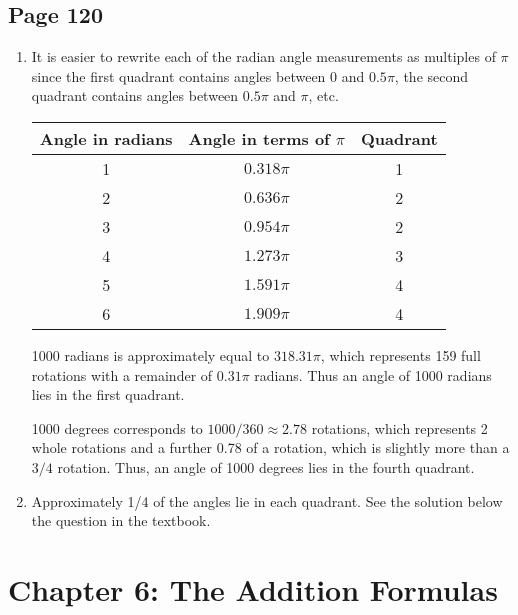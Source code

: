 \documentclass{article}
\newenvironment{solutions}[1]
{\subsection*{#1}
 \begin{enumerate}[leftmargin=1.5em]}
{\end{enumerate}}
\newcommand{\solution}{\item}
\begin{document}
\begin{solutions}{Page 120}
\solution %
It is easier to rewrite each of the radian angle measurements as multiples of $\pi$ since the first quadrant contains angles between $0$ and $0.5\pi$, the second quadrant contains angles between $0.5\pi$ and $\pi$, etc.

\begin{center}
\bgroup
\def\arraystretch{1.3}
\setlength\tabcolsep{10pt}
\begin{tabular}{|c|c|c|}
\hline
Angle in radians      & Angle in terms of $\pi$    & Quadrant \\ \hline
1     & $0.318\pi$ & 1        \\ \hline
2     & $0.636\pi$ & 2        \\ \hline
3     & $0.954\pi$ & 2        \\ \hline
4     & $1.273\pi$ & 3        \\ \hline
5     & $1.591\pi$ & 4        \\ \hline
6     & $1.909\pi$ & 4           \\ \hline
\end{tabular}
\egroup
\end{center}

1000 radians is approximately equal to $318.31\pi$, which represents 159 full rotations with a remainder of $0.31\pi$ radians. Thus an angle of 1000 radians lies in the first quadrant.

1000 degrees corresponds to $1000/360 \approx 2.78$ rotations, which represents 2 whole rotations and a further 0.78 of a rotation, which is slightly more than a $3/4$ rotation. Thus, an angle of 1000 degrees lies in the fourth quadrant.

\solution %
Approximately 1/4 of the angles lie in each quadrant. See the solution below the question in the textbook.

\end{solutions}

\section*{Chapter 6: The Addition Formulas}
\end{document}
